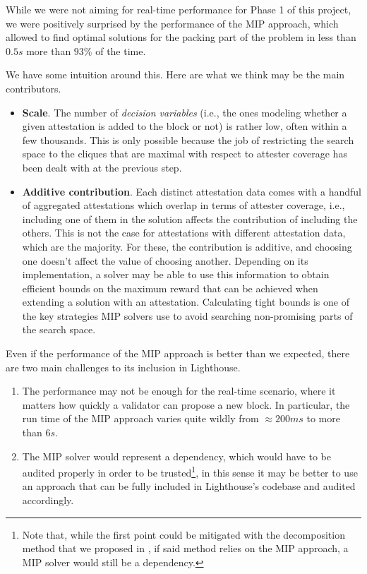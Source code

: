 \documentclass{article}
\begin{document}
While we were not aiming for real-time performance for Phase 1 of this project,
we were positively surprised by the performance of the MIP approach, which
allowed to find optimal solutions for the packing part of the problem in less
than $0.5s$ more than $93\%$ of the time. 

We have some intuition around this. Here are what we think may be the main
contributors.

\begin{itemize}
  \item \textbf{Scale}. The number of \emph{decision variables} (i.e., the ones
  modeling whether a given attestation is added to the block or not) is rather
  low, often within a few thousands. This is only possible because the job of
  restricting the search space to the cliques that are maximal with respect to
  attester coverage has been dealt with at the previous step.  \item
  \textbf{Additive contribution}. Each distinct attestation data comes with a
  handful of aggregated attestations which overlap in terms of attester
  coverage, i.e., including one of them in the solution affects the
  contribution of including the others. This is not the case for attestations
  with different attestation data, which are the majority. For these, the
  contribution is additive, and choosing one doesn't affect the value of
  choosing another. Depending on its implementation, a solver may be able to
  use this information to obtain efficient bounds on the maximum reward that
  can be achieved when extending a solution with an attestation. Calculating
  tight bounds is one of the key strategies MIP solvers use to avoid searching
  non-promising parts of the search space.
\end{itemize}

\noindent
Even if the performance of the MIP approach is better than we expected, there
are two main challenges to its inclusion in Lighthouse. 

\begin{enumerate}
  \item The performance may not be enough for the real-time scenario, where
  it matters how quickly a validator can propose a new block. In particular,
  the run time of the MIP approach varies quite wildly from $\approx 200ms$
  to more than $6s$.
  \item The MIP solver would represent a dependency, which would have to be
  audited properly in order to be trusted\footnote{Note that, while the first
  point could be mitigated with the decomposition method that we proposed in
  \cite{Satalia22b}, if said method relies on the MIP approach, a MIP solver
  would still be a dependency.}, in this sense it may be better to use an
  approach that can be fully included in Lighthouse's codebase and audited
  accordingly.
\end{enumerate}
\end{document}
